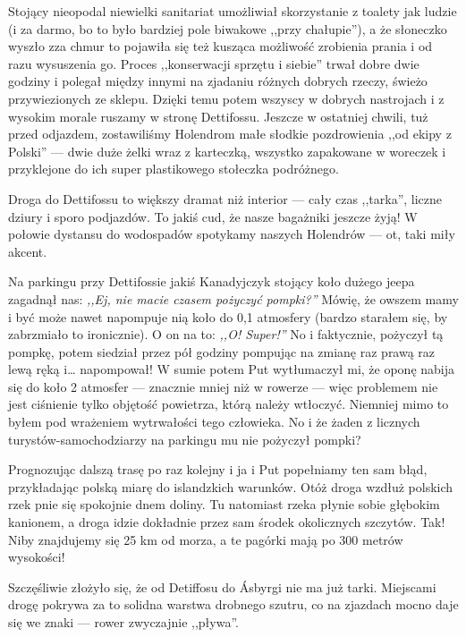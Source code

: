 Stojący nieopodal niewielki sanitariat umożliwiał skorzystanie z toalety jak ludzie (i za darmo, bo to było bardziej pole biwakowe ,,przy chałupie''), a że słoneczko wyszło zza chmur to pojawiła się też kusząca możliwość zrobienia prania i od razu wysuszenia go. Proces ,,konserwacji sprzętu i siebie'' trwał dobre dwie godziny i polegał między innymi na zjadaniu różnych dobrych rzeczy, świeżo przywiezionych ze sklepu. Dzięki temu potem wszyscy w dobrych nastrojach i z wysokim morale ruszamy w stronę Dettifossu. Jeszcze w ostatniej chwili, tuż przed odjazdem, zostawiliśmy Holendrom małe słodkie pozdrowienia ,,od ekipy z Polski'' --- dwie duże żelki wraz z karteczką, wszystko zapakowane w woreczek i przyklejone do ich super plastikowego stołeczka podróżnego.

Droga do Dettifossu to większy dramat niż interior --- cały czas ,,tarka'', liczne dziury i sporo podjazdów. To jakiś cud, że nasze bagażniki jeszcze żyją! W połowie dystansu do wodospadów spotykamy naszych Holendrów --- ot, taki miły akcent.


Na parkingu przy Dettifossie jakiś Kanadyjczyk stojący koło dużego jeepa zagadnął nas: \emph{,,Ej, nie macie czasem pożyczyć pompki?''} Mówię, że owszem mamy i być może nawet napompuje nią koło do 0,1 atmosfery (bardzo starałem się, by zabrzmiało to ironicznie). O on na to: \emph{,,O! Super!''} No i faktycznie, pożyczył tą pompkę, potem siedział przez pół godziny pompując na zmianę raz prawą raz lewą ręką i… napompował! W sumie potem Put wytłumaczył mi, że oponę nabija się do koło 2 atmosfer --- znacznie mniej niż w rowerze --- więc problemem nie jest ciśnienie tylko objętość powietrza, którą należy wtłoczyć. Niemniej mimo to byłem pod wrażeniem wytrwałości tego człowieka. No i że żaden z licznych turystów-samochodziarzy na parkingu mu nie pożyczył pompki?

Prognozując dalszą trasę po raz kolejny i ja i Put popełniamy ten sam błąd, przykładając polską miarę do islandzkich warunków. Otóż droga wzdłuż polskich rzek pnie się spokojnie dnem doliny. Tu natomiast rzeka płynie sobie głębokim kanionem, a droga idzie dokładnie przez sam środek okolicznych szczytów. Tak! Niby znajdujemy się 25 km od morza, a te pagórki mają po 300 metrów wysokości!

Szczęśliwie złożyło się, że od Detiffosu do Ásbyrgi nie ma już tarki. Miejscami drogę pokrywa za to solidna warstwa drobnego szutru, co na zjazdach mocno daje się we znaki --- rower zwyczajnie ,,pływa''.

